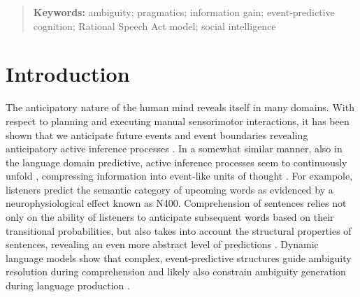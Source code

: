 \documentclass[10pt,a4paper]{article}
\begin{document}
\begin{abstract}

\textbf{Keywords:} 
ambiguity; pragmatics; information gain; event-predictive cognition; Rational Speech Act model; social intelligence
\end{abstract}



\section{Introduction}

The anticipatory nature of the human mind reveals itself in many domains.
With respect to planning and executing manual sensorimotor interactions, 
it has been shown that we anticipate future events and event boundaries revealing anticipatory active inference processes \cite{belardinelli2016s, belardinelli2018mental,Friston:2015,Hayhoe:2003,lohmann2019hands}.
In a somewhat similar manner, also in the language domain predictive, active inference processes seem to continuously unfold \cite{Christiansen:2016}, compressing information into event-like units of thought \cite{Gaerdenfors:2014}.
For exampole, listeners predict the semantic category of upcoming words \cite{federmeier2002picture} as evidenced by a neurophysiological effect known as N400.
Comprehension of sentences relies not only on the ability of listeners to anticipate subsequent words based on their transitional probabilities, but also takes into account the structural properties of sentences, revealing an even more abstract level of predictions \cite{levy2008expectation}.
Dynamic language models show that complex, event-predictive structures guide ambiguity resolution during comprehension and likely also constrain ambiguity generation during language production \cite{Elman:2019}. 
\end{document}
